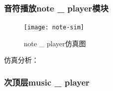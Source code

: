 \documentclass{../source/Experiment}
\begin{document}
            \subsubsection{音符播放note \_ player模块}
                \begin{figure}[H]
                    \centering
                    \texttt{[image: note-sim]}
                    \caption{note \_ player仿真图}
                \end{figure}

            仿真分析：

            \subsubsection{次顶层music \_ player}
\end{document}
